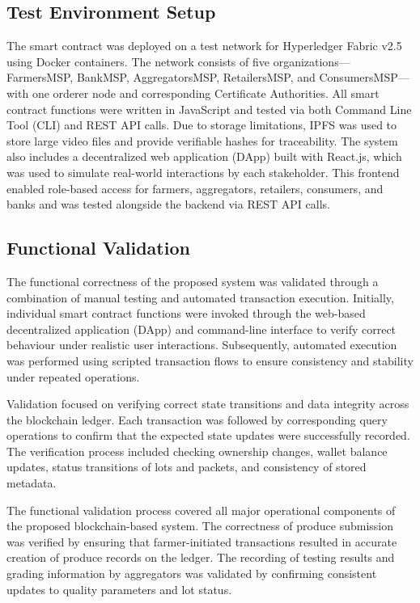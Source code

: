 \documentclass[12pt]{article}
\begin{document}
	\subsection{Test Environment Setup}
	
	The smart contract was deployed on a test network for Hyperledger Fabric v2.5 using Docker containers. The network consists of five organizations—FarmersMSP, BankMSP, AggregatorsMSP, RetailersMSP, and ConsumersMSP—with one orderer node and corresponding Certificate Authorities. All smart contract functions were written in JavaScript and tested via both Command Line Tool (CLI) and REST API calls. Due to storage limitations, IPFS was used to store large video files and provide verifiable hashes for traceability. The system also includes a decentralized web application (DApp) built with React.js, which was used to simulate real-world interactions by each stakeholder. This frontend enabled role-based access for farmers, aggregators, retailers, consumers, and banks and was tested alongside the backend via REST API calls.
	
	\subsection{Functional Validation}
	
	The functional correctness of the proposed system was validated through a combination of manual testing and automated transaction execution. Initially, individual smart contract functions were invoked through the web-based decentralized application (DApp) and command-line interface to verify correct behaviour under realistic user interactions. Subsequently, automated execution was performed using scripted transaction flows to ensure consistency and stability under repeated operations.
	
	Validation focused on verifying correct state transitions and data integrity across the blockchain ledger. Each transaction was followed by corresponding query operations to confirm that the expected state updates were successfully recorded. The verification process included checking ownership changes, wallet balance updates, status transitions of lots and packets, and consistency of stored metadata.
	
	The functional validation process covered all major operational components of the proposed blockchain-based system. The correctness of produce submission was verified by ensuring that farmer-initiated transactions resulted in accurate creation of produce records on the ledger. The recording of testing results and grading information by aggregators was validated by confirming consistent updates to quality parameters and lot status.
	
\end{document}
